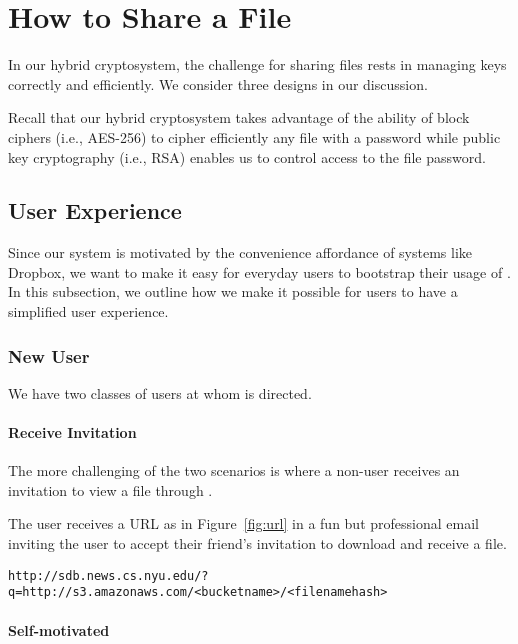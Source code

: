\section{How to Share a File}

In our hybrid cryptosystem, the challenge for sharing files rests in
managing keys correctly and efficiently. We consider three designs in
our discussion.

Recall that our hybrid cryptosystem takes advantage of the ability of
block ciphers (i.e., AES-256) to cipher efficiently any file with a
password while public key cryptography (i.e., RSA) enables us to
control access to the file password.

\subsection{User Experience}

Since our system is motivated by the convenience affordance of systems like Dropbox, we want to make it easy for everyday users to bootstrap their usage of \name. In this subsection, we outline how we make it possible for users to have a simplified  user experience.

\subsubsection*{New \name User}

We have two classes of users at whom \name is directed.

\paragraph{Receive Invitation} The more challenging of the two scenarios is where a non-\name user receives an invitation to view a file through \name. 

The user receives a URL as in Figure~\ref{fig:url} in a fun but professional email inviting the user to accept their friend's invitation to download \name and receive a file.

\begin{figure*}
{\tt http://sdb.news.cs.nyu.edu/?q=http://s3.amazonaws.com/<bucketname>/<filenamehash>}
\caption{What the URL looks like.}
\label{fig:url}
\end{figure*}

\paragraph{Self-motivated}

